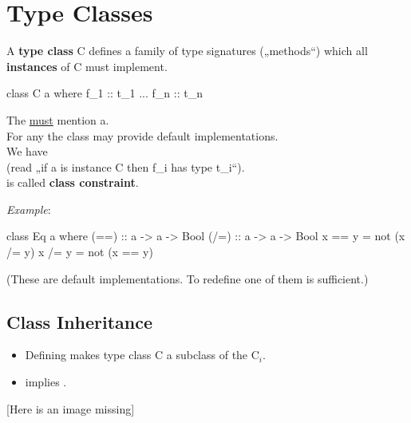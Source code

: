 

\chapter{Type Classes} %
\label{cha:type_classes}

A \textbf{type class} C defines a family of type signatures („methods“) which all \textbf{instances} of C must implement.

\begin{codebox}[haskell]
class C a where
    f_1 :: t_1
    ...
    f_n :: t_n
\end{codebox}
The  \underline{must} mention a.\\
For any  the class may provide default implementations. \\
We have  \\ (read „if a is instance C then f\_i has type t\_i“).\\
 is called \textbf{class constraint}.

\textit{Example}:

\begin{codebox}[haskell]
class Eq a where
    (==) :: a -> a -> Bool
    (/=) :: a -> a -> Bool
    x == y = not (x /= y)
    x /= y = not (x == y)
\end{codebox}
(These are default implementations. To redefine one of them is sufficient.)



\section{Class Inheritance}

\begin{itemize}
    \item Defining  makes type class C a subclass of the C$_i$.\\
    \item {} implies .
\end{itemize}

\vspace{9pt}
\textcolor{myorange}{[Here is an image missing]}
\vspace{9pt}


